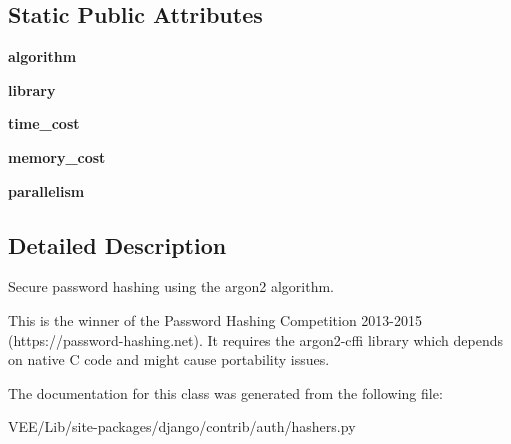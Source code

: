 \subsection*{Static Public Attributes}
\begin{DoxyCompactItemize}
\item 
\mbox{\label{classdjango_1_1contrib_1_1auth_1_1hashers_1_1_argon2_password_hasher_a013ad3a8866b95aa66a8cca26db3e188}} 
{\bfseries algorithm}
\item 
\mbox{\label{classdjango_1_1contrib_1_1auth_1_1hashers_1_1_argon2_password_hasher_a2c24dece15c02344a12df9665980d7a7}} 
{\bfseries library}
\item 
\mbox{\label{classdjango_1_1contrib_1_1auth_1_1hashers_1_1_argon2_password_hasher_a6d9bbfaf7826be4200ed7be3e98a2681}} 
{\bfseries time\+\_\+cost}
\item 
\mbox{\label{classdjango_1_1contrib_1_1auth_1_1hashers_1_1_argon2_password_hasher_a5ddd319ac385883812e5a874cbf19de4}} 
{\bfseries memory\+\_\+cost}
\item 
\mbox{\label{classdjango_1_1contrib_1_1auth_1_1hashers_1_1_argon2_password_hasher_afa79e16e03e35f6a6d9842aa613de4c1}} 
{\bfseries parallelism}
\end{DoxyCompactItemize}


\subsection{Detailed Description}
\begin{DoxyVerb}Secure password hashing using the argon2 algorithm.

This is the winner of the Password Hashing Competition 2013-2015
(https://password-hashing.net). It requires the argon2-cffi library which
depends on native C code and might cause portability issues.
\end{DoxyVerb}
 

The documentation for this class was generated from the following file\+:\begin{DoxyCompactItemize}
\item 
V\+E\+E/\+Lib/site-\/packages/django/contrib/auth/hashers.\+py\end{DoxyCompactItemize}
